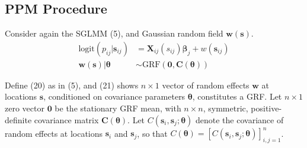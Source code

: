 \subsection{PPM Procedure}

Consider again the SGLMM (5), and Gaussian random field $\pmb{w}(\pmb{s})$.
\begin{align}
\text{logit}(p_{ij}|\pmb{s}_{ij}) &= \pmb{X}_{ij}(s_{ij}) \pmb{\beta}_{j} + w(\pmb{s}_{ij}) \\
\pmb{w}(\pmb{s}) | \pmb{\theta} &\sim \text{GRF}(\pmb{0}, \pmb{C}(\pmb{\theta}))
\end{align}

Define (20) as in (5), and (21) shows $n \times 1$ vector of random effects $\pmb{w}$ at locations $\pmb{s}$, conditioned on covariance parameters $\pmb{\theta}$, constitutes a GRF. Let $n \times 1$ zero vector $\pmb{0}$ be the stationary GRF mean, with $n \times n$, symmetric, positive-definite covariance matrix $\pmb{C}(\pmb{\theta})$. Let $C(\pmb{s}_{i}, \pmb{s}_{j}; \pmb{\theta})$ denote the covariance of random effects at locations $\pmb{s}_{i}$ and $\pmb{s}_{j}$, so that $C(\pmb{\theta}) = [C(\pmb{s}_{i}, \pmb{s}_{j}; \pmb{\theta})]_{i,j=1}^{n}$.

